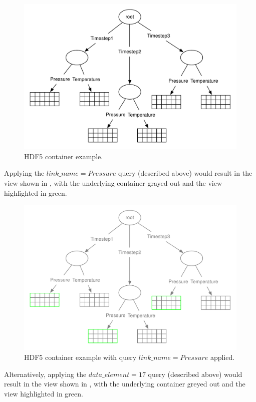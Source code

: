 \documentclass[letterpaper,hyper]{THG_RFC}
\begin{document}
\begin{figure}
\includegraphics[width=\mediumfigwidth]{HDF5File-Checkpoint}
\caption{HDF5 container example.}
\label{fig:HDF5File-Checkpoint}
\end{figure}

Applying the $link\_name = Pressure$ query (described above) would result
in the view shown in , with the
underlying container grayed out and the view highlighted in green.

\begin{figure}
\includegraphics[width=\mediumfigwidth]{HDF5File-Checkpoint-View1}
\caption{HDF5 container example with query $link\_name = Pressure$ applied.}
\label{fig:HDF5File-Checkpoint-View1}
\end{figure}

Alternatively, applying the $data\_element = 17$ query (described above) would
result in the view shown in , with the
underlying container greyed out and the view highlighted in green.
\end{document}
